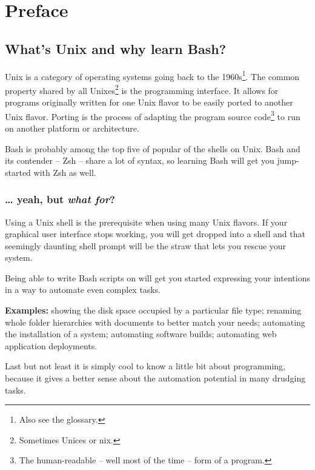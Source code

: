 \documentclass{olli-handout}
\begin{document}
\maketitle

\chapter{Preface}

\section{What's Unix and why learn Bash?}

Unix is a category of operating systems going back to the 1960s\footnote{Also see the glossary.}. The common property shared by all Unixes\footnote{Sometimes Unices or \textasteriskcentered{}nix.} is the programming interface. It allows for programs originally written for one Unix flavor to be easily ported to another Unix flavor. Porting is the process of adapting the program source code\footnote{The human-readable -- well most of the time -- form of a program.} to run on another platform or architecture.

Bash is probably among the top five of popular of the shells on Unix. Bash and its contender -- Zsh -- share a lot of syntax, so learning Bash will get you jump-started with Zsh as well.

\subsection{\ldots{} yeah, but \emph{what for}?}

Using a Unix shell is the prerequisite when using many Unix flavors. If your graphical user interface stops working, you will get dropped into a shell and that seemingly daunting shell prompt will be the straw that lets you rescue your system.

Being able to write Bash scripts on will get you started expressing your intentions in a way to automate even complex tasks.

\textbf{Examples:} showing the disk space occupied by a particular file type; renaming whole folder hierarchies with documents to better match your needs; automating the installation of a system; automating software builds; automating web application deployments.

Last but not least it is simply cool to know a little bit about programming, because it gives a better sense about the automation potential in many drudging tasks.
\end{document}
